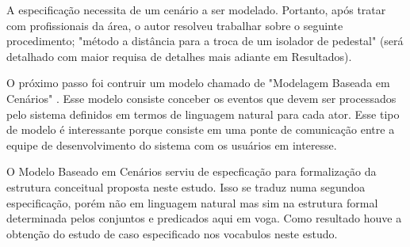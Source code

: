 A especificação necessita de um cenário a ser modelado. Portanto, após tratar com profissionais da área, o autor resolveu trabalhar sobre o seguinte procedimento; "método a distância para a troca de um isolador de pedestal" (será detalhado com maior requisa de detalhes mais adiante em Resultados).

O próximo passo foi contruir um modelo chamado de "Modelagem Baseada em Cenários" \cite{softwareeng}. Esse modelo consiste conceber os eventos que devem ser processados pelo sistema definidos em termos de linguagem natural para cada ator. Esse tipo de modelo é interessante porque consiste em uma ponte de comunicação entre a equipe de desenvolvimento do sistema com os usuários em interesse.     

O Modelo Baseado em Cenários serviu de especficação para formalização da estrutura conceitual proposta neste estudo. Isso se traduz numa segundoa especificação, porém não em linguagem natural mas sim na estrutura formal determinada pelos conjuntos e predicados aqui em voga. Como resultado houve a obtenção do estudo de caso especificado nos vocabulos neste estudo.